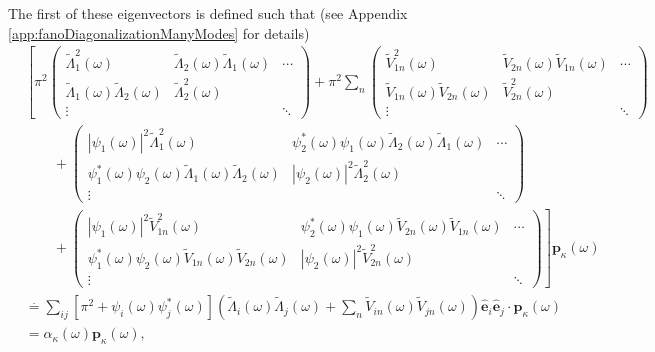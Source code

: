 \documentclass{article}
\begin{document}
The first of these eigenvectors is defined such that (see Appendix \ref{app:fanoDiagonalizationManyModes} for details)
\begin{equation}
\begin{split}
&\left[\pi^2
\begin{pmatrix}
\tilde{\Lambda}_1^2(\omega) & \tilde{\Lambda}_2(\omega)\tilde{\Lambda}_1(\omega) & \cdots\\
\tilde{\Lambda}_1(\omega)\tilde{\Lambda}_2(\omega) & \tilde{\Lambda}_2^2(\omega) & \\
\vdots & & \ddots
\end{pmatrix}
+ \pi^2\sum_n
\begin{pmatrix}
\tilde{V}_{1n}^2(\omega) & \tilde{V}_{2n}(\omega)\tilde{V}_{1n}(\omega) & \cdots\\
\tilde{V}_{1n}(\omega)\tilde{V}_{2n}(\omega) & \tilde{V}_{2n}^2(\omega) & \\
\vdots & & \ddots
\end{pmatrix}
\right.\\
&\qquad + 
\begin{pmatrix}
|\psi_1(\omega)|^2\tilde{\Lambda}_1^2(\omega) & \psi_2^*(\omega)\psi_1(\omega)\tilde{\Lambda}_2(\omega)\tilde{\Lambda}_1(\omega) & \cdots\\
\psi_1^*(\omega)\psi_2(\omega)\tilde{\Lambda}_1(\omega)\tilde{\Lambda}_2(\omega) & |\psi_2(\omega)|^2\tilde{\Lambda}_2^2(\omega) & \\
\vdots & & \ddots
\end{pmatrix}
\\
&\left.\qquad + 
\begin{pmatrix}
|\psi_1(\omega)|^2\tilde{V}_{1n}^2(\omega) & \psi_2^*(\omega)\psi_1(\omega)\tilde{V}_{2n}(\omega)\tilde{V}_{1n}(\omega) & \cdots\\
\psi_1^*(\omega)\psi_2(\omega)\tilde{V}_{1n}(\omega)\tilde{V}_{2n}(\omega) & |\psi_2(\omega)|^2\tilde{V}_{2n}^2(\omega) & \\
\vdots & & \ddots
\end{pmatrix}\right]\mathbf{p}_\kappa(\omega)\\
&\overset{.}{=} \sum_{ij}\left[\pi^2 + \psi_i(\omega)\psi_j^*(\omega)\right]\left(\tilde{\Lambda}_i(\omega)\tilde{\Lambda}_j(\omega) + \sum_n\tilde{V}_{in}(\omega)\tilde{V}_{jn}(\omega)\right)\hat{\mathbf{e}}_i\hat{\mathbf{e}}_j\cdot\mathbf{p}_\kappa(\omega)\\
&= \alpha_\kappa(\omega)\mathbf{p}_\kappa(\omega),
\end{split}
\end{equation}
\end{document}
